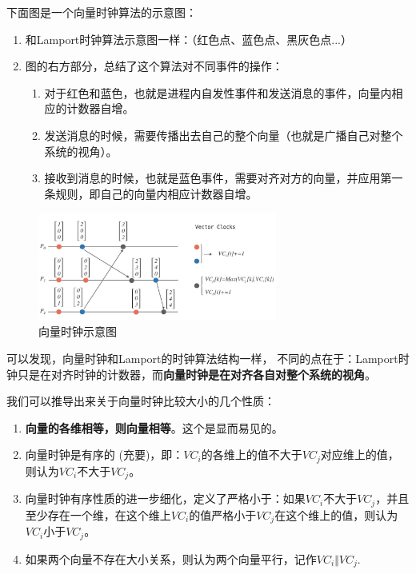 \documentclass[cn,11pt,chinese]{elegantbook}
\begin{document}
下面图是一个向量时钟算法的示意图：

\begin{enumerate}
    \item 和Lamport时钟算法示意图一样：（红色点、蓝色点、黑灰色点...）
    \item 图的右方部分，总结了这个算法对不同事件的操作：
    \begin{enumerate}
        \item 对于红色和蓝色，也就是进程内自发性事件和发送消息的事件，向量内相应的计数器自增。
        \item 发送消息的时候，需要传播出去自己的整个向量（也就是广播自己对整个系统的视角）。
        \item 接收到消息的时候，也就是蓝色事件，需要对齐对方的向量，并应用第一条规则，即自己的向量内相应计数器自增。
    \end{enumerate}
\end{enumerate}

\begin{figure}
    \centering
    \includegraphics[width=0.7\textwidth]{images/appendix-a-13.jpeg}
    \caption{向量时钟示意图}
\end{figure}

可以发现，向量时钟和Lamport的时钟算法结构一样， 不同的点在于：Lamport时钟只是在对齐时钟的计数器，而\textbf{向量时钟是在对齐各自对整个系统的视角}。

我们可以推导出来关于向量时钟比较大小的几个性质：

\begin{enumerate}
    \item \textbf{向量的各维相等，则向量相等}。这个是显而易见的。
    \item 向量时钟是有序的 (充要)，即：$VC_i$的各维上的值不大于$VC_j$对应维上的值，则认为$VC_i$不大于$VC_j$。
    \item 向量时钟有序性质的进一步细化，定义了严格小于：如果$VC_i$不大于$VC_j$，并且至少存在一个维，在这个维上$VC_i$的值严格小于$VC_j$在这个维上的值，则认为$VC_i$小于$VC_j$。
    \item 如果两个向量不存在大小关系，则认为两个向量平行，记作$VC_i \Vert VC_j$.
\end{enumerate}
\end{document}
